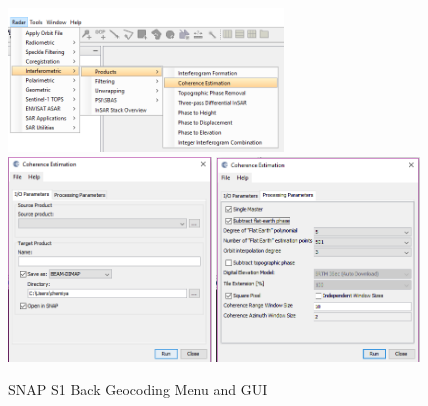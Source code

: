 \documentclass[a4paper,11.5pt,onecolumn]{article}
\begin{document}
\begin{figure}[htbp]
\begin{center}
\includegraphics[width=0.65\textwidth]{images/SNAP_S1_Coherence}
\includegraphics[width=0.48\textwidth]{images/SNAP_S1_Coherence_GUI}
\includegraphics[width=0.48\textwidth]{images/SNAP_S1_Coherence_GUI_Params}
\end{center}
\caption{SNAP S1 Back Geocoding Menu and GUI}
\label{fig11}
\end{figure}

\newpage
%
%

%
%
%
%
%
%

\end{document}
